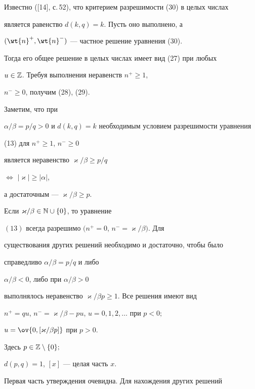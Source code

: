 Известно ([14], с.\,52), что критерием разрешимости (30) в целых числах


является равенство $d(k,q) = k$. Пусть оно выполнено, а


$(\wt{n}^{+}, \wt{n}^{-})$ --- частное решение уравнения (30).


Тогда его общее решение в целых числах имеет вид (27) при любых


$u\in\Bbb Z$. Требуя выполнения неравенств $n^{+}\ge1$,


$n^{-} \ge 0$, получим (28), (29).





Заметим, что при


$\alpha/\beta=p/q>0$ и $d(k,q)=k$ необходимым условием разрешимости уравнения


(13) для $n^{+}\ge 1$, $n^{-}\ge0$


является неравенство $\varkappa/\beta \ge p/q$


$\Longleftrightarrow$ $|\varkappa|\ge |\alpha|$,


а достаточным --- $\varkappa/\beta \ge p$.





\begin{lem}


Если $\varkappa/\beta \in \Bbb N\cup\{ 0 \}$, то уравнение


$(13)$ всегда разрешимо $(n^{+}=0$, $n^{-} = \varkappa/\beta)$. Для


существования других решений необходимо и достаточно, чтобы было


справедливо $\alpha/\beta=p/q$ и либо


$\alpha/\beta<0$, либо при $\alpha/\beta > 0$


выполнялось неравенство $\varkappa/\beta p \ge 1$. Все решения имеют вид


$n^{+} =qu$, $n^{-}= \varkappa/\beta -pu$, $u=0,1,2,\dotsc$ при $p<0;$


$u=\ov{0,[\varkappa/\beta p]}$ при $p>0$.


Здесь $p\in \Bbb Z\setminus\{ 0\};$


$d(p,q)=1$, $[x]$ --- целая часть $x$.


\end{lem}





Первая часть утверждения очевидна. Для нахождения других решений


